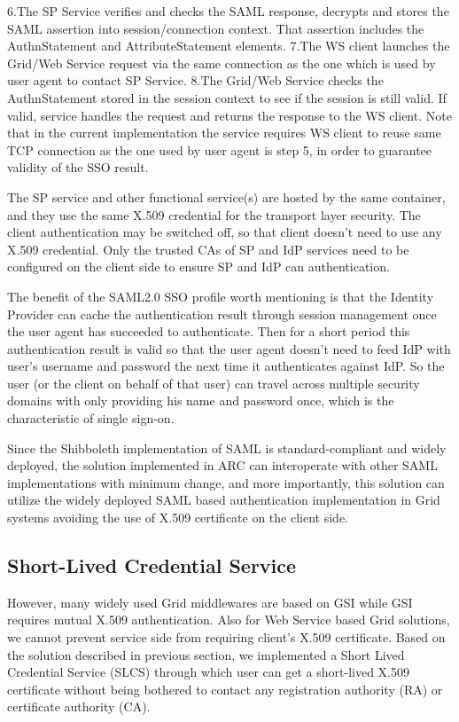 \documentclass[twocolumn]{svjour3}         %
\begin{document}
6.The SP Service verifies and checks the SAML response, decrypts and stores the SAML assertion into session/connection context. That assertion includes the AuthnStatement and AttributeStatement elements.
7.The WS client launches the Grid/Web Service request via the same connection as the one which is used by user agent to contact SP Service.
8.The Grid/Web Service checks the AuthnStatement stored in the session context to see if the session is still valid. If valid, service handles the  request and returns the response to the WS client. Note that in the current implementation the service requires WS client to reuse same TCP connection as the one used by user agent is step 5, in order to guarantee  validity of the SSO result.

The SP service and other functional service(s) are hosted by the same container, and they use the same X.509 credential for the transport layer security. The client authentication may be switched off, so that client doesn’t need to use any X.509 credential. Only the trusted CAs of SP and IdP services need to be configured on the client side to ensure SP and IdP can authentication.

The benefit of the SAML2.0 SSO profile worth mentioning is that the Identity Provider can cache the authentication result through session management once the user agent has succeeded to authenticate. Then for a short period this authentication result is valid so that the user agent doesn’t need to feed IdP with user’s username and password the next time it authenticates against IdP. So the user (or the client on behalf of that user) can travel across multiple security domains with only providing his name and password once, which is the characteristic of single sign-on.

Since the Shibboleth implementation of SAML is standard-compliant and widely deployed, the solution implemented in ARC can interoperate with other SAML implementations with minimum change, and more importantly, this solution can utilize the widely deployed SAML based authentication implementation in Grid systems avoiding the use of X.509 certificate on the client side.


\subsection{Short-Lived Credential Service}
\label{sec:slcs}
However, many widely used Grid middlewares are based on GSI while GSI requires mutual X.509 authentication. Also for Web Service based Grid solutions, we cannot prevent service side from requiring client's X.509 certificate.  Based on the solution described in previous section, we implemented a Short Lived Credential Service (SLCS) through which user can get a short-lived X.509 certificate without being bothered to contact any registration authority (RA) or certificate authority (CA).
\end{document}
